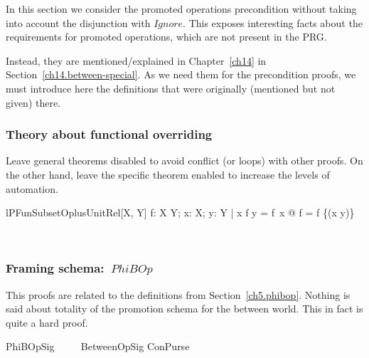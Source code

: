 In this section we consider the promoted operations precondition
without taking into account the disjunction with $Ignore$. This exposes
interesting facts about the requirements for promoted operations, which
are not present in the PRG.

Instead, they are mentioned/explained in Chapter~\ref{ch14} in Section~\ref{ch14.between-special}.
As we need them for the precondition proofs, we must introduce here the definitions that were
originally (mentioned but not given) there.

\subsubsection{Theory about functional overriding}

Leave general theorems disabled to avoid conflict (or loops) with other proofs.
On the other hand, leave the specific theorem enabled to increase the levels of
automation.



\begin{LToolkit}
\begin{theorem}{lPFunSubsetOplusUnitRel}[X, Y]
    \forall  f: X \pfun  Y; x: X; y: Y | x \in  \dom  f \land  y = f~x @ f = f \oplus  \{(x \mapsto  y)\}
\end{theorem}~\end{LToolkit}

\subsubsection{Framing schema:~$PhiBOp$}\label{ch8.betw.promotionschema}

This proofs are related to the definitions from Section~\ref{ch5.phibop}.
Nothing is said about totality of the promotion schema for the between world.
This in fact is quite a hard proof.
%
\begin{LNewSDef}
\begin{zed}
   PhiBOpSig ~~~~ BetweenOpSig \land ConPurse
\end{zed}~\end{LNewSDef}

